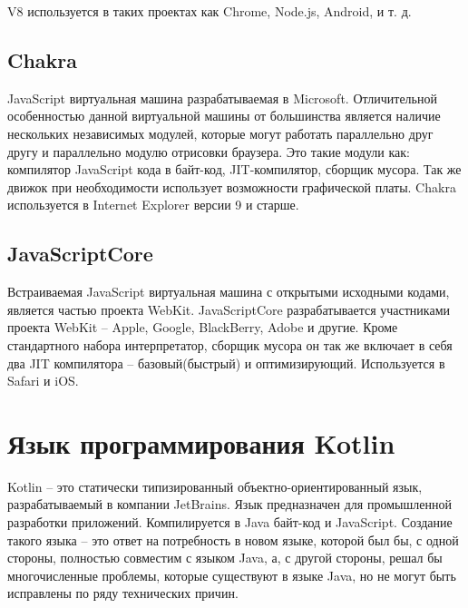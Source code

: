 V8 используется в таких проектах как Chrome, Node.js, Android, и т. д.
\cite{wiki:V8:en, wiki:V8:ru}

\subsection{Chakra}
JavaScript виртуальная машина разрабатываемая в Microsoft. Отличительной особенностью данной виртуальной машины от большинства является наличие нескольких независимых модулей, которые могут работать параллельно друг другу и параллельно модулю отрисовки браузера. Это такие модули как: компилятор JavaScript кода в байт-код, JIT-компилятор, сборщик мусора. Так же движок при необходимости использует возможности графической платы.
Chakra используется в Internet Explorer версии 9 и старше.
\cite{wiki:Chakra:en}

\subsection{JavaScriptCore}

Встраиваемая JavaScript виртуальная машина с открытыми исходными кодами, является частью проекта WebKit. JavaScriptCore разрабатывается участниками проекта WebKit -- Apple, Google, BlackBerry, Adobe и другие. Кроме стандартного набора интерпретатор, сборщик мусора он так же включает в себя два JIT компилятора -- базовый(быстрый) и оптимизирующий.
Используется в Safari и iOS.
\cite{JavaScriptCore}




\section{Язык программирования Kotlin}

Kotlin -- это статически типизированный объектно-ориентированный язык, разрабатываемый в компании JetBrains.
Язык предназначен для промышленной разработки приложений. Компилируется в Java байт-код и JavaScript.
Создание такого языка -- это ответ на потребность в новом языке, которой был бы, с одной стороны, полностью совместим с языком Java, а, с другой стороны, решал бы многочисленные проблемы, которые существуют в языке Java, но не могут быть исправлены по ряду технических причин.

